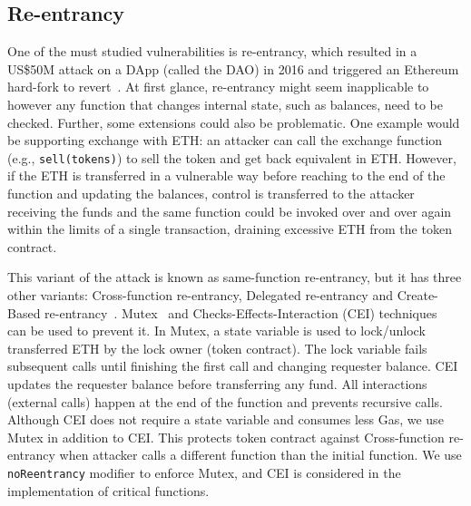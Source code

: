 \subsection{Re-entrancy}
One of the must studied vulnerabilities is re-entrancy, which resulted in a US\$50M attack on a DApp (called the DAO) in 2016 and triggered an Ethereum hard-fork to revert~\cite{DAO1}. At first glance, re-entrancy might seem inapplicable to \erc however any function that changes internal state, such as balances, need to be checked. Further, some \erc extensions could also be problematic. One example would be supporting exchange with ETH: an attacker can call the exchange function (e.g., \texttt{sell(tokens)}) to sell the token and get back equivalent in ETH. However, if the ETH is transferred in a vulnerable way before reaching to the end of the function and updating the balances, control is transferred to the attacker receiving the funds and the same function could be invoked over and over again within the limits of a single transaction, draining excessive ETH from the token contract.


This variant of the attack is known as same-function re-entrancy, but it has three other variants: Cross-function re-entrancy, Delegated re-entrancy and Create-Based re-entrancy~\cite{SEREUM}. Mutex~\cite{WiKiMutex} and Checks-Effects-Interaction (CEI) techniques~\cite{SolidtyDocSec} can be used to prevent it. In Mutex, a state variable is used to lock/unlock transferred ETH by the lock owner (\ie token contract). The lock variable fails subsequent calls until finishing the first call and changing requester balance. CEI updates the requester balance before transferring any fund. All interactions (\ie external calls) happen at the end of the function and prevents recursive calls. Although CEI does not require a state variable and consumes less Gas, we use Mutex in addition to CEI. This protects token contract against Cross-function re-entrancy when attacker calls a different function than the initial function. We use \texttt{noReentrancy} modifier to enforce Mutex, and CEI is considered in the implementation of critical functions.



